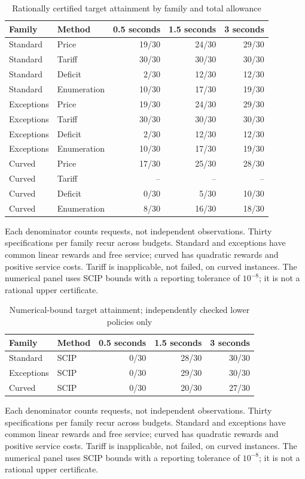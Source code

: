 \documentclass[11pt,letterpaper]{article}
\theoremstyle{definition}\newtheorem{remark}[theorem]{Remark}
\begin{document}
\begin{table}[p]\centering\caption{Rationally certified target attainment by family and total allowance}\label{tab:newrational60}
\begin{tabular}{llrrr}\toprule Family & Method & 0.5 seconds & 1.5 seconds & 3 seconds\\\midrule
Standard & Price & 19/30 & 24/30 & 29/30\\
Standard & Tariff & 30/30 & 30/30 & 30/30\\
Standard & Deficit & 2/30 & 12/30 & 12/30\\
Standard & Enumeration & 10/30 & 17/30 & 19/30\\
Exceptions & Price & 19/30 & 24/30 & 29/30\\
Exceptions & Tariff & 30/30 & 30/30 & 30/30\\
Exceptions & Deficit & 2/30 & 12/30 & 12/30\\
Exceptions & Enumeration & 10/30 & 17/30 & 19/30\\
Curved & Price & 17/30 & 25/30 & 28/30\\
Curved & Tariff & -- & -- & --\\
Curved & Deficit & 0/30 & 5/30 & 10/30\\
Curved & Enumeration & 8/30 & 16/30 & 18/30\\
\bottomrule\end{tabular}\par\smallskip\begin{minipage}{\textwidth}\small Each denominator counts requests, not independent observations. Thirty specifications per family recur across budgets. Standard and exceptions have common linear rewards and free service; curved has quadratic rewards and positive service costs. Tariff is inapplicable, not failed, on curved instances. The numerical panel uses SCIP bounds with a reporting tolerance of $10^{-8}$; it is not a rational upper certificate.\end{minipage}\end{table}
\begin{table}[p]\centering\caption{Numerical-bound target attainment; independently checked lower policies only}\label{tab:newnumerical60}
\begin{tabular}{llrrr}\toprule Family & Method & 0.5 seconds & 1.5 seconds & 3 seconds\\\midrule
Standard & SCIP & 0/30 & 28/30 & 30/30\\
Exceptions & SCIP & 0/30 & 29/30 & 30/30\\
Curved & SCIP & 0/30 & 20/30 & 27/30\\
\bottomrule\end{tabular}\par\smallskip\begin{minipage}{\textwidth}\small Each denominator counts requests, not independent observations. Thirty specifications per family recur across budgets. Standard and exceptions have common linear rewards and free service; curved has quadratic rewards and positive service costs. Tariff is inapplicable, not failed, on curved instances. The numerical panel uses SCIP bounds with a reporting tolerance of $10^{-8}$; it is not a rational upper certificate.\end{minipage}\end{table}
\end{document}
